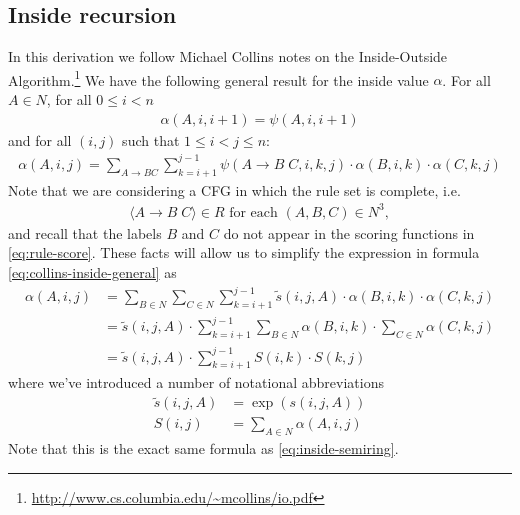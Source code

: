 \subsection{Inside recursion}
%
In this derivation we follow Michael Collins notes on the Inside-Outside Algorithm.\footnote{\url{http://www.cs.columbia.edu/~mcollins/io.pdf}} We have the following general result for the inside value $\alpha$. For all $A \in N$, for all $0 \leq i < n$
\begin{align}
    \label{eq:collins-inside-base}
    \alpha(A,i,i+1) = \psi(A, i, i+1)
\end{align}
and for all $(i, j)$ such that $1 \leq i < j \leq n$:
\begin{align}
    \label{eq:collins-inside-general}
    \alpha(A,i,j) = \sum_{A \to B C} \sum_{k=i+1}^{j-1} \psi(A \to B \;C, i, k, j) \cdot \alpha(B,i,k) \cdot \alpha(C,k,j)
\end{align}
Note that we are considering a CFG in which the rule set is complete, i.e.
\begin{align}
  \langle A \to B \;C \rangle \in R \text{ for each } (A, B, C) \in N^3,
\end{align}
and recall that the labels $B$ and $C$ do not appear in the scoring functions in \ref{eq:rule-score}. These facts will allow us to simplify the expression in formula \ref{eq:collins-inside-general} as
\begin{subequations}
\begin{align*}
    \alpha(A,i,j) &= \sum_{B \in N} \sum_{C \in N} \sum_{k=i+1}^{j-1} \tilde{s}(i, j, A) \cdot \alpha(B,i,k) \cdot \alpha(C,k,j) \\
        &= \tilde{s}(i, j, A) \cdot \sum_{k=i+1}^{j-1} \sum_{B \in N} \alpha(B,i,k) \cdot \sum_{C \in N} \alpha(C,k,j) \\
        &= \tilde{s}(i, j, A) \cdot \sum_{k=i+1}^{j-1} S(i,k) \cdot S(k,j) \label{eq:final-inside}
\end{align*}
\end{subequations}
where we've introduced a number of notational abbreviations
\begin{align*}
  \tilde{s}(i, j, A)
    &= \exp( s(i, j, A) ) \\
    S(i,j) &= \sum_{A \in N} \alpha(A,i,j)
\end{align*}
Note that this is the exact same formula as \ref{eq:inside-semiring}.

